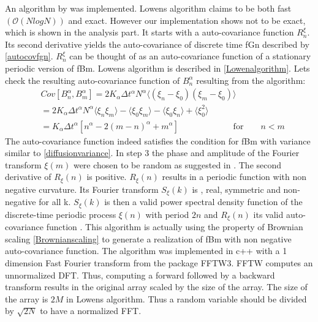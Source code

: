 \documentclass[
  a4paper,BCOR10mm,oneside,
  headsepline,footsepline,%
  fleqn,openbib
]{scrbook}
\begin{document}
 An algorithm by \citet{Lowen1999} was implemented. Lowens algorithm claims to be both fast $(\mathcal{O}(NlogN))$ and exact. However our implementation shows not to be exact, which is shown in the analysis part. It starts with a auto-covariance function $R^{\xi}_n$. Its second derivative yields the auto-covariance of discrete time fGn described by \cref{autocovfgn}. $R^{\xi}_n$ can be thought of as an auto-covariance function of a stationary periodic version of fBm. Lowens algorithm is described in \cref{Lowenalgorithm}. Lets check the resulting auto-covariance function of $B^{\alpha}_n$ resulting from the algorithm: 
\begin{align}
  & Cov[B^{\alpha}_n,B^{\alpha}_m]= 2 K_{\alpha} \Delta t^{\alpha} N^{\alpha} \langle (\xi_n- \xi_0) (\xi_m- \xi_0)\rangle \\
 &=  2 K_{\alpha} \Delta t^{\alpha} N^{\alpha}\langle\xi_n \xi_m\rangle -\langle \xi_0 \xi_m \rangle - \langle \xi_0 \xi_n\rangle +\langle \xi_0^2\rangle \\ 
 &= K_{\alpha} \Delta t^{\alpha}[n^{\alpha}-2(m-n)^{\alpha}+m^{\alpha}]\qquad \qquad \qquad \text{ for} \qquad n < m
\end{align}
The auto-covariance function indeed satisfies the condition for fBm with variance similar to \cref{diffusionvariance}. In step 3 the phase and amplitude of the Fourier transform  $\xi(m)$ were chosen to be random  as suggested in \cite{Timmer1995}. The second derivative of $R_{\xi}(n) $ is positive. $R_{\xi}(n) $ results in a periodic function with non negative curvature. Its Fourier transform $S_{\xi}(k)$ is , real, symmetric  and non-negative for all k. $S_{\xi}(k)$ is then a valid power spectral density function of the discrete-time periodic process $\xi(n)$ with period $2n$ and  $R_{\xi}(n)$ its valid auto-covariance function \cite{Lowen1999}. This algorithm is actually using the property of Brownian scaling \cref{Brownianscaling} to generate a realization of fBm  with non negative auto-covariance function. The algorithm was implemented in c++ with a 1 dimension Fast Fourier transform from the package FFTW3. FFTW computes an unnormalized DFT. Thus, computing a forward followed by a backward transform results in the original array scaled by the size of the array. The size of the array is $2M$  in Lowens algorithm. Thus a random variable should be divided by $\sqrt{2N}$ to have a normalized FFT.
\end{document}
